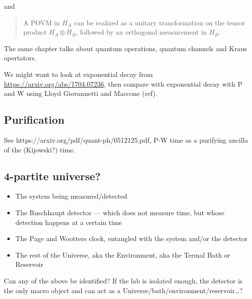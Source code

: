 and

\begin{quotation}
A POVM in $H_A$ can be realized as a unitary transformation on the tensor
product $H_A \otimes H_B$, followed by an orthogonal measurement in $H_B$.
\end{quotation}

The same chapter talks about quantum operations, quantum channels and Kraus opertators.

We might want to look at exponential decay from \url{https://arxiv.org/abs/1704.07236},
then compare with exponential decay with P and W using Lloyd Giovannetti and Maccone (ref).

\subsection{Purification}

See https://arxiv.org/pdf/quant-ph/0512125.pdf, P-W time as a purifying ancilla
of the (Kijowski?) time.

\subsection{4-partite universe?}
\begin{itemize}
  \item{The system being measured/detected}
  \item{The Ruschhaupt detector --- which does not measure time, but whose detection happens at a certain time}
  \item{The Page and Wootters clock, entangled with the system and/or the detector}
  \item{The rest of the Universe, aka the Environment, aka the Termal Bath or Reservoir}
\end{itemize}

Can any of the above be identified? If the lab is isolated enough,
the detector is the only macro object and can act as a Universe/bath/environment/reservoir\dots?

\fi